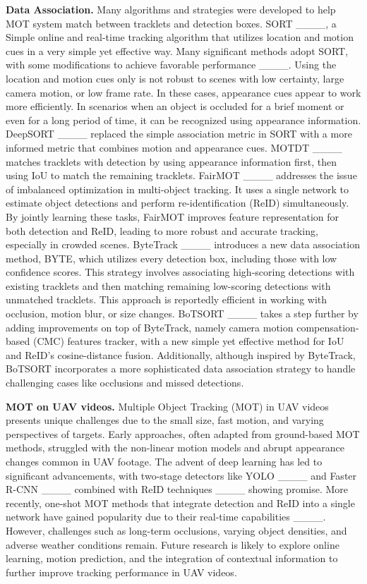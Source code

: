 \textbf{Data Association.} Many algorithms and strategies were developed to help MOT system match between tracklets and detection boxes. SORT ____, a Simple online and real-time tracking algorithm that utilizes location and motion cues in a very simple yet effective way. Many significant methods adopt SORT, with some modifications to achieve favorable performance ____. Using the location and motion cues only is not robust to scenes with low certainty, large camera motion, or low frame rate. In these cases, appearance cues appear to work more efficiently. In scenarios when an object is occluded for a brief moment or even for a long period of time, it can be recognized using appearance information. DeepSORT ____ replaced the simple association metric in SORT with a more informed metric that combines motion and appearance cues. MOTDT ____ matches tracklets with detection by using appearance information first, then using IoU to match the remaining tracklets. FairMOT ____ addresses the issue of imbalanced optimization in multi-object tracking. It uses a single network to estimate object detections and perform re-identification (ReID) simultaneously. By jointly learning these tasks, FairMOT improves feature representation for both detection and ReID, leading to more robust and accurate tracking, especially in crowded scenes. ByteTrack ____ introduces a new data association method, BYTE, which utilizes every detection box, including those with low confidence scores. This strategy involves associating high-scoring detections with existing tracklets and then matching remaining low-scoring detections with unmatched tracklets. This approach is reportedly efficient in working with occlusion, motion blur, or size changes. BoTSORT ____ takes a step further by adding improvements on top of ByteTrack, namely camera motion compensation-based (CMC) features tracker, with a new simple yet effective method for IoU and ReID’s cosine-distance fusion. Additionally, although inspired by ByteTrack, BoTSORT incorporates a more sophisticated data association strategy to handle challenging cases like occlusions and missed detections. 

\textbf{MOT on UAV videos.} 
Multiple Object Tracking (MOT) in UAV videos presents unique challenges due to the small size, fast motion, and varying perspectives of targets. Early approaches, often adapted from ground-based MOT methods, struggled with the non-linear motion models and abrupt appearance changes common in UAV footage. The advent of deep learning has led to significant advancements, with two-stage detectors like YOLO ____ and Faster R-CNN ____ combined with ReID techniques ____ showing promise. More recently, one-shot MOT methods that integrate detection and ReID into a single network have gained popularity due to their real-time capabilities ____. However, challenges such as long-term occlusions, varying object densities, and adverse weather conditions remain. Future research is likely to explore online learning, motion prediction, and the integration of contextual information to further improve tracking performance in UAV videos.